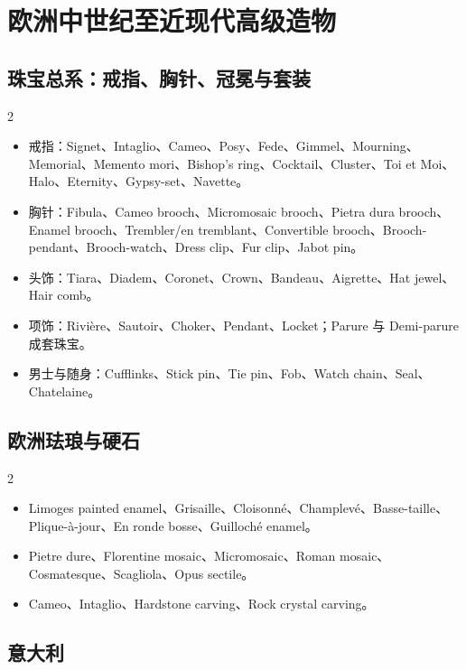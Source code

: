 \documentclass[lang=en,a4paper,11pt]{elegantpaper}
\begin{document}
\section{欧洲中世纪至近现代高级造物}


\subsection{珠宝总系：戒指、胸针、冠冕与套装}


\begin{multicols}{2}
\begin{itemize}
\item 戒指：Signet、Intaglio、Cameo、Posy、Fede、Gimmel、Mourning、Memorial、Memento mori、Bishop's ring、Cocktail、Cluster、Toi et Moi、Halo、Eternity、Gypsy-set、Navette。
\item 胸针：Fibula、Cameo brooch、Micromosaic brooch、Pietra dura brooch、Enamel brooch、Trembler/en tremblant、Convertible brooch、Brooch-pendant、Brooch-watch、Dress clip、Fur clip、Jabot pin。
\item 头饰：Tiara、Diadem、Coronet、Crown、Bandeau、Aigrette、Hat jewel、Hair comb。
\item 项饰：Rivière、Sautoir、Choker、Pendant、Locket；Parure 与 Demi-parure 成套珠宝。
\item 男士与随身：Cufflinks、Stick pin、Tie pin、Fob、Watch chain、Seal、Chatelaine。
\end{itemize}
\end{multicols}

\subsection{欧洲珐琅与硬石}


\begin{multicols}{2}
\begin{itemize}
\item Limoges painted enamel、Grisaille、Cloisonné、Champlevé、Basse-taille、Plique-à-jour、En ronde bosse、Guilloché enamel。
\item Pietre dure、Florentine mosaic、Micromosaic、Roman mosaic、Cosmatesque、Scagliola、Opus sectile。
\item Cameo、Intaglio、Hardstone carving、Rock crystal carving。
\end{itemize}
\end{multicols}

\subsection{意大利}
\end{document}
